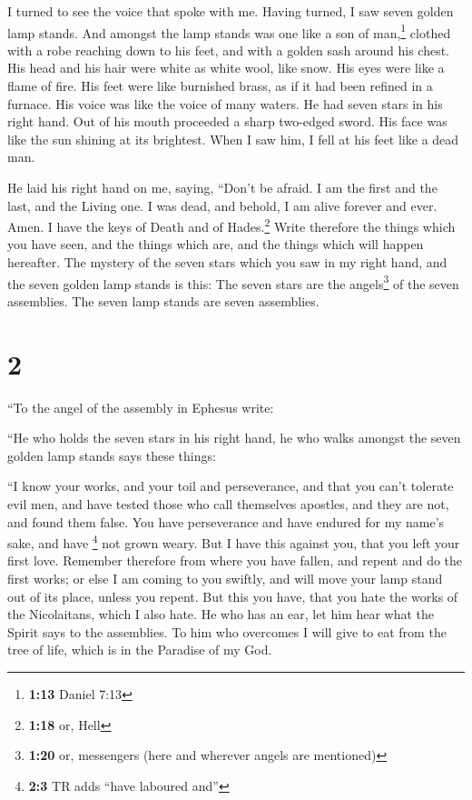  I turned to see the voice that spoke with me. Having
turned, I saw seven golden lamp stands.  And amongst the
lamp stands was one like a son of man,\footnote{\textbf{1:13} Daniel
  7:13} clothed with a robe reaching down to his feet, and with a golden
sash around his chest.  His head and his hair were white
as white wool, like snow. His eyes were like a flame of fire.
 His feet were like burnished brass, as if it had been
refined in a furnace. His voice was like the voice of many waters.
 He had seven stars in his right hand. Out of his mouth
proceeded a sharp two-edged sword. His face was like the sun shining at
its brightest.  When I saw him, I fell at his feet like a
dead man.

He laid his right hand on me, saying, ``Don't be afraid. I am the first
and the last,  and the Living one. I was dead, and
behold, I am alive forever and ever. Amen. I have the keys of Death and
of Hades.\footnote{\textbf{1:18} or, Hell}  Write
therefore the things which you have seen, and the things which are, and
the things which will happen hereafter.  The mystery of
the seven stars which you saw in my right hand, and the seven golden
lamp stands is this: The seven stars are the angels\footnote{\textbf{1:20}
  or, messengers (here and wherever angels are mentioned)} of the seven
assemblies. The seven lamp stands are seven assemblies.

\hypertarget{section-1}{%
\section{2}\label{section-1}}

 ``To the angel of the assembly in Ephesus write:

``He who holds the seven stars in his right hand, he who walks amongst
the seven golden lamp stands says these things:

 ``I know your works, and your toil and perseverance, and
that you can't tolerate evil men, and have tested those who call
themselves apostles, and they are not, and found them false.
 You have perseverance and have endured for my name's
sake, and have \footnote{\textbf{2:3} TR adds ``have laboured and''} not
grown weary.  But I have this against you, that you left
your first love.  Remember therefore from where you have
fallen, and repent and do the first works; or else I am coming to you
swiftly, and will move your lamp stand out of its place, unless you
repent.  But this you have, that you hate the works of the
Nicolaitans, which I also hate.  He who has an ear, let
him hear what the Spirit says to the assemblies. To him who overcomes I
will give to eat from the tree of life, which is in the Paradise of my
God.

